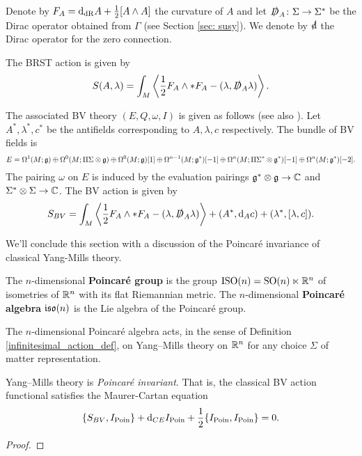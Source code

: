 \documentclass[10pt, oneside]{article}
\begin{document}
Denote by $F_A = {\rm d}_{\mathrm{dR}} A + \frac{1}{2}[A\wedge A]$ the curvature of $A$ and let $\slashed{D}_A \colon \Sigma \to \Sigma^*$ be the Dirac operator obtained from $\Gamma$ (see Section \ref{sec: susy}). We denote by $\sd\d$ the Dirac operator for the zero connection.

The BRST action is given by
\[S(A, \lambda) = \int_M \left\langle \frac{1}{2} F_A \wedge \ast F_A - (\lambda, \slashed{D}_A \lambda)\right\rangle.\]

The associated BV theory $(E, Q, \omega, I)$ is given as follows (see also \cite[Section 3.1]{ElliottYoo1}). Let $A^*, \lambda^*, c^*$ be the antifields corresponding to $A, \lambda, c$ respectively. The bundle of BV fields is
\[E = \Omega^1(M; \mathfrak g)\oplus \Omega^0(M; \Pi\Sigma\otimes \mathfrak g)\oplus \Omega^0(M; \mathfrak g)[1] \oplus \Omega^{n-1}(M; \mathfrak g^*)[-1]\oplus \Omega^n(M; \Pi\Sigma^*\otimes \mathfrak g^*)[-1]\oplus \Omega^n(M; \mathfrak g^*)[-2].\]
The pairing $\omega$ on $E$ is induced by the evaluation pairings $\mathfrak{g}^*\otimes \mathfrak{g}\rightarrow \mathbb C$ and $\Sigma^*\otimes\Sigma\rightarrow\mathbb C$. The BV action is given by
\[S_{BV} = \int_M \left\langle \frac{1}{2} F_A \wedge \ast F_A - (\lambda, \slashed{D}_A \lambda)\right\rangle + (A^*, {\rm d}_A c) + (\lambda^*, [\lambda, c]).\]

We'll conclude this section with a discussion of the Poincar\'e invariance of classical Yang-Mills theory.

\begin{definition}
The $n$-dimensional {\bf Poincar\'e group} is the group $\mathrm{ISO}(n) = \mathrm{SO}(n) \ltimes \mathbb R^n$ of isometries of $\mathbb R^n$ with its flat Riemannian metric.  The $n$-dimensional {\bf Poincar\'e algebra} $\mathfrak{iso}(n)$ is the Lie algebra of the Poincar\'e group.
\end{definition}

The $n$-dimensional Poincar\'e algebra acts, in the sense of Definition \ref{infinitesimal_action_def}, on Yang--Mills theory on $\mathbb R^n$ for any choice $\Sigma$ of matter representation.

\begin{prop} \label{YM_Poincare_invariant_prop}
Yang--Mills theory is \emph{Poincar\'e invariant}.  That is, the classical BV action functional satisfies the Maurer-Cartan equation
\[\{S_{BV}, I_{\mathrm{Poin}}\} + {\rm d}_{CE} I_{\mathrm{Poin}} + \frac 12 \{I_{\mathrm{Poin}}, I_{\mathrm{Poin}}\} = 0.\]
\end{prop}
\begin{proof}
\end{proof}
\end{document}
